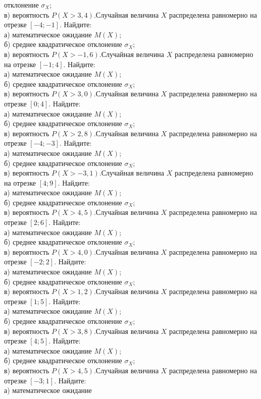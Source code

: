 отклонение $\sigma_X$; \\ \quad в) вероятность $P(X>3{,}4)$.Случайная величина $X$ распределена равномерно на отрезке $[-4; -1]$. Найдите: \\ \quad а) математическое ожидание $M(X)$; \\ \quad б) среднее квадратическое отклонение $\sigma_X$; \\ \quad в) вероятность $P(X>-1{,}6)$.Случайная величина $X$ распределена равномерно на отрезке $[-1; 4]$. Найдите: \\ \quad а) математическое ожидание $M(X)$; \\ \quad б) среднее квадратическое отклонение $\sigma_X$; \\ \quad в) вероятность $P(X>3{,}0)$.Случайная величина $X$ распределена равномерно на отрезке $[0; 4]$. Найдите: \\ \quad а) математическое ожидание $M(X)$; \\ \quad б) среднее квадратическое отклонение $\sigma_X$; \\ \quad в) вероятность $P(X>2{,}8)$.Случайная величина $X$ распределена равномерно на отрезке $[-4; -3]$. Найдите: \\ \quad а) математическое ожидание $M(X)$; \\ \quad б) среднее квадратическое отклонение $\sigma_X$; \\ \quad в) вероятность $P(X>-3{,}1)$.Случайная величина $X$ распределена равномерно на отрезке $[4; 9]$. Найдите: \\ \quad а) математическое ожидание $M(X)$; \\ \quad б) среднее квадратическое отклонение $\sigma_X$; \\ \quad в) вероятность $P(X>4{,}5)$.Случайная величина $X$ распределена равномерно на отрезке $[2; 6]$. Найдите: \\ \quad а) математическое ожидание $M(X)$; \\ \quad б) среднее квадратическое отклонение $\sigma_X$; \\ \quad в) вероятность $P(X>4{,}0)$.Случайная величина $X$ распределена равномерно на отрезке $[-2; 2]$. Найдите: \\ \quad а) математическое ожидание $M(X)$; \\ \quad б) среднее квадратическое отклонение $\sigma_X$; \\ \quad в) вероятность $P(X>1{,}2)$.Случайная величина $X$ распределена равномерно на отрезке $[1; 5]$. Найдите: \\ \quad а) математическое ожидание $M(X)$; \\ \quad б) среднее квадратическое отклонение $\sigma_X$; \\ \quad в) вероятность $P(X>3{,}8)$.Случайная величина $X$ распределена равномерно на отрезке $[4; 5]$. Найдите: \\ \quad а) математическое ожидание $M(X)$; \\ \quad б) среднее квадратическое отклонение $\sigma_X$; \\ \quad в) вероятность $P(X>4{,}5)$.Случайная величина $X$ распределена равномерно на отрезке $[-3; 1]$. Найдите: \\ \quad а) математическое ожидание 